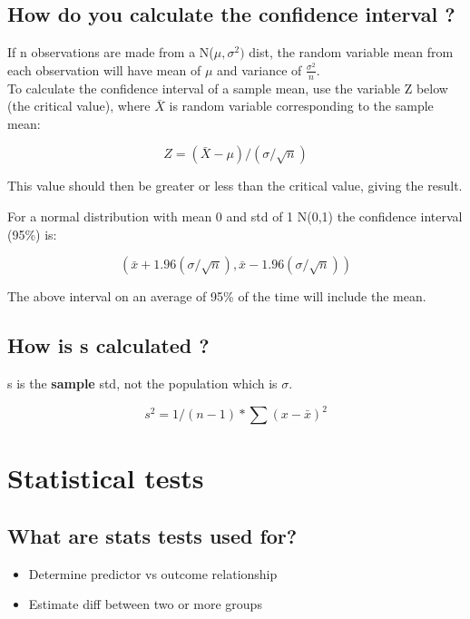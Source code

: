 \documentclass[11pt]{scrartcl} %
\begin{document}
\subsection{How do you calculate the confidence interval
?}

If n observations are made from a N(\(\mu,\sigma^2)\) dist, the random variable mean from each observation will have
mean of \(\mu\) and variance of \(\frac{\sigma^2}{n}\).\\

To calculate the confidence interval of a sample mean, use the
variable Z below (the critical value), where \(\bar{X}\) is random variable corresponding to the
sample mean:

\begin{equation}
	Z = (\bar{X} - \mu)/ (\sigma/ \sqrt{n})
\end{equation}

This value should then be greater or less than the critical value, giving the result.

For a normal distribution with mean 0 and std of 1 N(0,1) the confidence
interval (95\%) is:

\begin{equation}
	(\bar{x} + 1.96 (\sigma/\sqrt{n}),\bar{x} - 1.96 (\sigma/\sqrt{n}))
\end{equation}

The above interval on an average of 95\% of the time will include the
mean.

\subsection{How is s calculated ?}

s is the \textbf{sample} std, not the population which is \(\sigma\).

\begin{equation}
	s^2 = 1/(n-1) * \sum(x-\bar{x})^2
\end{equation}

\section{Statistical tests}

\subsection{What are stats tests used for?}

\begin{itemize}
	\item Determine predictor vs outcome relationship
	\item Estimate diff between two or more groups
\end{itemize}
\end{document}
